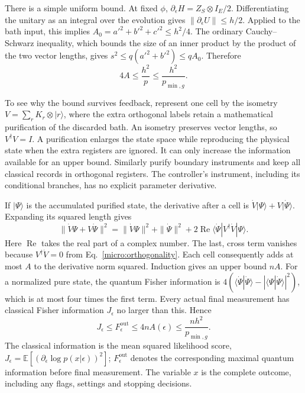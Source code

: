 \documentclass[11pt,a4paper]{article}
\numberwithin{equation}{section}
\theoremstyle{remark}
\begin{document}
There is a simple uniform bound. At fixed $\phi$,
$\partial_\epsilon H=Z_S\otimes I_E/2$. Differentiating the unitary
as an integral over the evolution gives
$\|\partial_\epsilon U\|\le h/2$. Applied to the bath input, this
implies $A_0=a'^2+b'^2+c'^2\le h^2/4$. The ordinary
Cauchy--Schwarz inequality, which bounds the size of an inner product
by the product of the two vector lengths, gives
$s^2\le q(a'^2+b'^2)\le qA_0$. Therefore
\begin{equation}
 4A\le\frac{h^2}{p}\le\frac{h^2}{p_{\min,g}}.
 \label{micro:Abound}
\end{equation}

To see why the bound survives feedback, represent one cell by the
isometry $V=\sum_rK_r\otimes|r\rangle$, where the extra orthogonal
labels retain a mathematical purification of the discarded bath.
An isometry preserves vector lengths, so $V^\dagger V=I$.
A purification enlarges the state space while reproducing the physical
state when the extra registers are ignored. It can only increase the
information available for an upper bound. Similarly purify boundary
instruments and keep all classical records in orthogonal registers.
The controller's instrument, including its conditional branches, has no
explicit parameter derivative.

If $|\Psi\rangle$ is the accumulated purified state, the derivative after
a cell is $\dot V|\Psi\rangle+V|\dot\Psi\rangle$. Expanding its squared
length gives
\begin{equation}
 \|\dot V\Psi+V\dot\Psi\|^2
 =\|\dot V\Psi\|^2+\|\dot\Psi\|^2
   +2\operatorname{Re}\langle\dot\Psi|V^\dagger\dot V|\Psi\rangle.
\end{equation}
Here $\operatorname{Re}$ takes the real part of a complex number.
The last, cross term vanishes because $V^\dagger\dot V=0$ from
Eq.~\eqref{micro:orthogonality}. Each cell consequently adds at most $A$
to the derivative norm squared. Induction gives an upper bound $nA$.
For a normalized pure state, the quantum Fisher information is
$4(\langle\dot\Psi|\dot\Psi\rangle-
 |\langle\Psi|\dot\Psi\rangle|^2)$, which is at most four times the
first term. Every actual final measurement has classical Fisher
information $J_\epsilon$ no larger than this. Hence
\begin{equation}
 J_\epsilon\le F_\epsilon^{\mathrm{out}}
          \le4nA(\epsilon)
          \le\frac{nh^2}{p_{\min,g}}.
 \label{micro:adaptivebound}
\end{equation}
The classical information is the mean squared likelihood score,
$J_\epsilon=\mathbb E[(\partial_\epsilon\log p(x|\epsilon))^2]$;
$F_\epsilon^{\mathrm{out}}$ denotes the corresponding maximal quantum
information before final measurement. The variable $x$ is the complete
outcome, including any flags, settings and stopping decisions.
\end{document}
